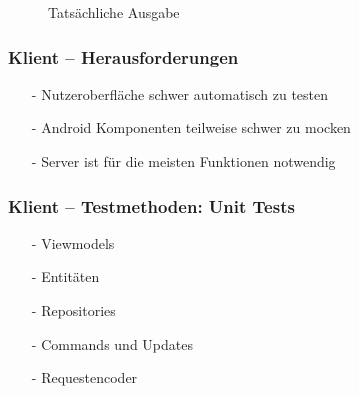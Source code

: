 \documentclass[aspectratio=1610]{beamer}
\begin{document}
\begin{frame}[plain]
\begin{minipage}{0.45\textwidth}
{\begin{figure}
                    \caption{Tatsächliche Ausgabe}
                \end{figure}
            }
        \end{minipage}
    \end{frame}


	\begin{frame}[plain]
        \frametitle{\textbf{Klient} -- Herausforderungen}

        \begin{itemize}
          \item[-] Nutzeroberfläche schwer automatisch zu testen
          \item[-] Android Komponenten teilweise schwer zu mocken
          \item[-] Server ist für die meisten Funktionen notwendig
        \end{itemize}
  \end{frame}

\begin{frame}[plain]
        \frametitle{\textbf{Klient} -- Testmethoden: Unit Tests}

        \begin{itemize}
          \item[-] Viewmodels
          \item[-] Entitäten
          \item[-] Repositories
          \item[-] Commands und Updates
          \item[-] Requestencoder
        \end{itemize}
  \end{frame}
\end{document}
